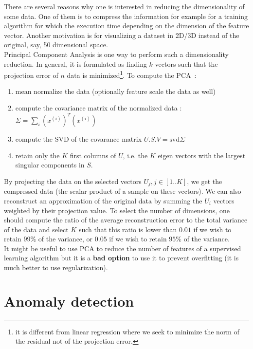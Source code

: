 \documentclass[10pt,a4paper]{article}
\begin{document}
There are several reasons why one is interested in reducing the dimensionality of some data. One of them is to compress the information for example for a training algorithm for which the execution time depending on the dimension of the feature vector. Another motivation is for visualizing a dataset in 2D/3D instead of the original, say, 50 dimensional space.\\

Principal Component Analysis is one way to perform such a dimensionality reduction. In general, it is formulated as finding $k$ vectors such that the projection error of $n$ data is minimized\footnote{it is different from linear regression where we seek to minimize the norm of the residual not of the projection error.}. To compute the PCA~:
\begin{enumerate}
\item mean normalize the data (optionally feature scale the data as well)
\item compute the covariance matrix of the normalized data : $\Sigma = \sum_i (x^{(i)})^T (x^{(i)})$
\item compute the SVD of the covarance matrix $U.S.V = \mathrm{svd}{\Sigma}$
\item retain only the $K$ first columns of $U$, i.e. the $K$ eigen vectors with the largest singular components in $S$. 
\end{enumerate}

By projecting the data on the selected vectors $U_j , j \in [1..K]$, we get the compressed data (the scalar product of a sample on these vectors). We can also reconstruct an approximation of the original data by summing the $U_i$ vectors weighted by their projection value. To select the number of dimensions, one should compute the ratio of the average reconstruction error to the total variance of the data and select $K$ such that this ratio is lower than $0.01$ if we wish to retain 99\% of the variance, or $0.05$ if we wish to retain $95\%$ of the variance. \\

It might be useful to use PCA to reduce the number of features of a supervised learning algorithm but it is a \textbf{bad option} to use it to prevent overfitting (it is much better to use regularization).

\section{Anomaly detection}
\end{document}
